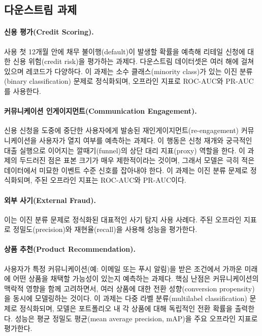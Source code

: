 \subsection{다운스트림 과제}
\label{sec:downstreams}

\paragraph*{신용 평가(Credit Scoring).}
사용 첫 12개월 안에 채무 불이행(default)이 발생할 확률을 예측해 리테일 신청에 대한 신용 위험(credit risk)을 평가하는 과제다.
다운스트림 데이터셋은 여러 해에 걸쳐 있으며 레코드가 다양하다.
이 과제는 소수 클래스(minority class)가 있는 이진 분류(binary classification) 문제로 정식화되며, 오프라인 지표로 ROC-AUC와 PR-AUC를 사용한다.

\paragraph*{커뮤니케이션 인게이지먼트(Communication Engagement).}
신용 신청을 도중에 중단한 사용자에게 발송된 재인게이지먼트(re-engagement) 커뮤니케이션을 사용자가 열지 여부를 예측하는 과제다.
이 행동은 신청 재개와 궁극적인 대출 실행으로 이어지는 깔때기(funnel)의 상단 대리 지표(proxy) 역할을 한다.
이 과제의 두드러진 점은 표본 크기가 매우 제한적이라는 것이며, 그래서 모델은 극히 적은 데이터에서 미묘한 이벤트 수준 신호를 잡아내야 한다.
이 과제는 이진 분류 문제로 정식화되며, 주된 오프라인 지표는 ROC-AUC와 PR-AUC이다.

\paragraph*{외부 사기(External Fraud).}
이는 이진 분류 문제로 정식화된 대표적인 사기 탐지 사용 사례다.
주된 오프라인 지표로 정밀도(precision)와 재현율(recall)을 사용해 성능을 평가한다.

\paragraph*{상품 추천(Product Recommendation).}
사용자가 특정 커뮤니케이션(예: 이메일 또는 푸시 알림)을 받은 조건에서 가까운 미래에 어떤 상품을 채택할 가능성이 있는지 예측하는 과제다.
핵심 난점은 커뮤니케이션의 맥락적 영향을 함께 고려하면서, 여러 상품에 대한 전환 성향(conversion propensity)을 동시에 모델링하는 것이다.
이 과제는 다중 라벨 분류(multilabel classification) 문제로 정식화되며, 모델은 포트폴리오 내 각 상품에 대해 독립적인 전환 확률을 출력한다.
성능은 평균 정밀도 평균(mean average precision, mAP)을 주요 오프라인 지표로 평가한다.

